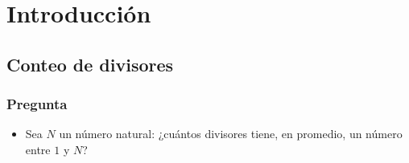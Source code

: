 \section{Introducción}
\subsection{Conteo de divisores}

\begin{frame}
  \frametitle{Pregunta}

  \begin{itemize}
    \item Sea \(N\) un número natural: ¿cuántos divisores tiene, en promedio, un número entre \(1\) y \(N\)?
  \end{itemize}

  \vspace{1em}
\end{frame}
